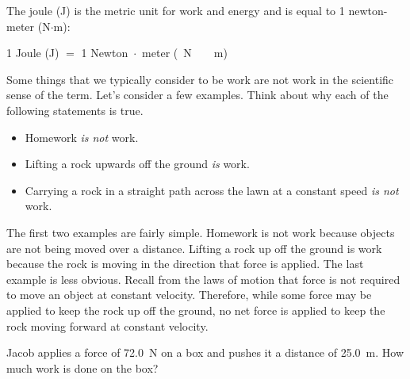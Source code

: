 \documentclass{article}
\numberwithin{equation}{section}
\numberwithin{figure}{section}
\begin{document}
The \gls{joule} (J) is the metric unit for work and energy and is equal to 1 newton-meter (N$\cdot$m):

\begin{center}
    1 Joule (J) $=$ 1 Newton $\!\cdot\!$ meter (\SI{}{N\!\cdot\!m})
\end{center}

Some things that we typically consider to be work are not work in the scientific sense of the term. Let's consider a few examples. Think about why each of the following statements is true.

\begin{itemize}
\setlength\itemsep{-0.8ex}
    \item Homework \textit{is not} work.
    \item Lifting a rock upwards off the ground \textit{is} work.
    \item Carrying a rock in a straight path across the lawn at a constant speed \textit{is not} work.
\end{itemize}

The first two examples are fairly simple. Homework is not work because objects are not being moved over a distance. Lifting a rock up off the ground is work because the rock is moving in the direction that force is applied. The last example is less obvious. Recall from the laws of motion that force is not required to move an object at constant velocity. Therefore, while some force may be applied to keep the rock up off the ground, no net force is applied to keep the rock moving forward at constant velocity.

\begin{example} \label{HKavsZ}
Jacob applies a force of \SI{72.0}{N} on a box and pushes it a distance of \SI{25.0}{m}. How much work is done on the box?
\end{example}

\begin{center}
\end{center}
\end{document}
